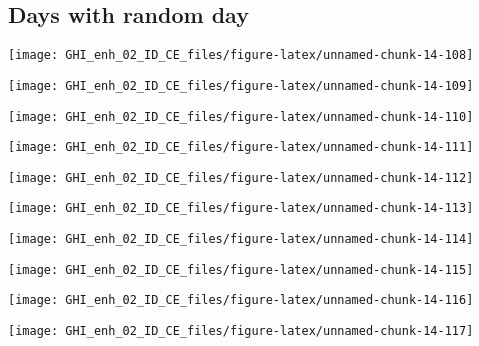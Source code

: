 \documentclass[
  10pt,
  a4paper,oneside]{article}
\begin{document}
\FloatBarrier

\hypertarget{days-with-random-day}{%
\subsection{Days with random day}\label{days-with-random-day}}

\begin{center}\texttt{[image: GHI\_enh\_02\_ID\_CE\_files/figure-latex/unnamed-chunk-14-108]} \end{center}

\begin{center}\texttt{[image: GHI\_enh\_02\_ID\_CE\_files/figure-latex/unnamed-chunk-14-109]} \end{center}

\begin{center}\texttt{[image: GHI\_enh\_02\_ID\_CE\_files/figure-latex/unnamed-chunk-14-110]} \end{center}

\begin{center}\texttt{[image: GHI\_enh\_02\_ID\_CE\_files/figure-latex/unnamed-chunk-14-111]} \end{center}

\begin{center}\texttt{[image: GHI\_enh\_02\_ID\_CE\_files/figure-latex/unnamed-chunk-14-112]} \end{center}

\begin{center}\texttt{[image: GHI\_enh\_02\_ID\_CE\_files/figure-latex/unnamed-chunk-14-113]} \end{center}

\begin{center}\texttt{[image: GHI\_enh\_02\_ID\_CE\_files/figure-latex/unnamed-chunk-14-114]} \end{center}

\begin{center}\texttt{[image: GHI\_enh\_02\_ID\_CE\_files/figure-latex/unnamed-chunk-14-115]} \end{center}

\begin{center}\texttt{[image: GHI\_enh\_02\_ID\_CE\_files/figure-latex/unnamed-chunk-14-116]} \end{center}

\begin{center}\texttt{[image: GHI\_enh\_02\_ID\_CE\_files/figure-latex/unnamed-chunk-14-117]} \end{center}
\end{document}

